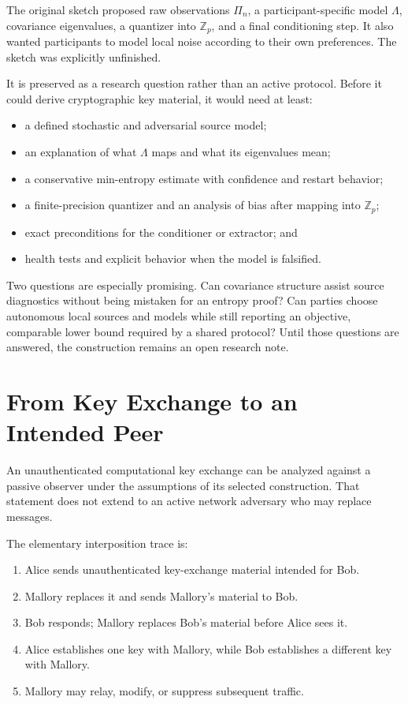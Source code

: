 The original sketch proposed raw observations $\Pi_n$, a participant-specific
model $\Lambda$, covariance eigenvalues, a quantizer into $\mathbb{Z}_p$, and a
final conditioning step.  It also wanted participants to model local noise
according to their own preferences.  The sketch was explicitly unfinished.

It is preserved as a research question rather than an active protocol.  Before
it could derive cryptographic key material, it would need at least:

\begin{itemize}
    \item a defined stochastic and adversarial source model;
    \item an explanation of what $\Lambda$ maps and what its eigenvalues mean;
    \item a conservative min-entropy estimate with confidence and restart
    behavior;
    \item a finite-precision quantizer and an analysis of bias after mapping
    into $\mathbb{Z}_p$;
    \item exact preconditions for the conditioner or extractor; and
    \item health tests and explicit behavior when the model is falsified.
\end{itemize}

Two questions are especially promising.  Can covariance structure assist
source diagnostics without being mistaken for an entropy proof?  Can parties
choose autonomous local sources and models while still reporting an objective,
comparable lower bound required by a shared protocol?  Until those questions
are answered, the construction remains an open research note.

\section{From Key Exchange to an Intended Peer}

An unauthenticated computational key exchange can be analyzed against a
passive observer under the assumptions of its selected construction.  That
statement does not extend to an active network adversary who may replace
messages.

The elementary interposition trace is:

\begin{enumerate}
    \item Alice sends unauthenticated key-exchange material intended for Bob.
    \item Mallory replaces it and sends Mallory's material to Bob.
    \item Bob responds; Mallory replaces Bob's material before Alice sees it.
    \item Alice establishes one key with Mallory, while Bob establishes a
    different key with Mallory.
    \item Mallory may relay, modify, or suppress subsequent traffic.
\end{enumerate}

